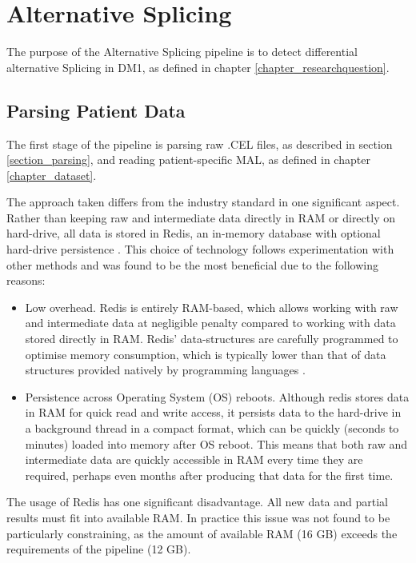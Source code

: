 \section{Alternative Splicing} \label{chapter_altersplice}

The purpose of the Alternative Splicing pipeline is to detect differential alternative Splicing in DM1, as defined in chapter \ref{chapter_researchquestion}.

\subsection{Parsing Patient Data} \label{section_parsingpatientdata}

The first stage of the pipeline is parsing raw .CEL files, as described in section \ref{section_parsing}, and reading patient-specific MAL, as defined in chapter \ref{chapter_dataset}.

The approach taken differs from the industry standard in one significant aspect. Rather than keeping raw and intermediate data directly in RAM or directly on hard-drive, all data is stored in Redis, an in-memory database with optional hard-drive persistence \parencite{redis2017}. This choice of technology follows experimentation with other methods and was found to be the most beneficial due to the following reasons:

\begin{itemize}
\item Low overhead. Redis is entirely RAM-based, which allows working with raw and intermediate data at negligible penalty compared to working with data stored directly in RAM. Redis' data-structures are carefully programmed to optimise memory consumption, which is typically lower than that of data structures provided natively by programming languages \parencite[adam]{redis2017}.
\item Persistence across Operating System (OS) reboots. Although redis stores data in RAM for quick read and write access, it persists data to the hard-drive in a background thread in a compact format, which can be quickly (seconds to minutes) loaded into memory after OS reboot. This means that both raw and intermediate data are quickly accessible in RAM every time they are required, perhaps even months after producing that data for the first time.
\end{itemize}

The usage of Redis has one significant disadvantage. All new data and partial results must fit into available RAM. In practice this issue was not found to be particularly constraining, as the amount of available RAM (16 GB) exceeds the requirements of the pipeline (12 GB).

